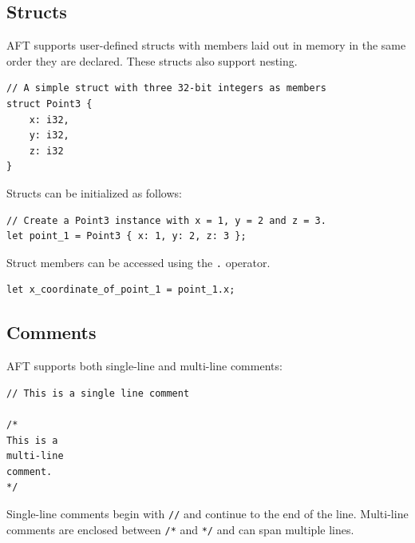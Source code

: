 \subsection{Structs}
AFT supports user-defined structs with members laid out in memory in the same order they are declared. These structs also support nesting.
\begin{verbatim}
// A simple struct with three 32-bit integers as members
struct Point3 {
    x: i32,
    y: i32,
    z: i32
}
\end{verbatim}
Structs can be initialized as follows:
\begin{verbatim}
// Create a Point3 instance with x = 1, y = 2 and z = 3.
let point_1 = Point3 { x: 1, y: 2, z: 3 };
\end{verbatim}
Struct members can be accessed using the \texttt{.} operator.
\begin{verbatim}
let x_coordinate_of_point_1 = point_1.x;
\end{verbatim}

\subsection{Comments}
AFT supports both single-line and multi-line comments:

\begin{verbatim}
// This is a single line comment

/* 
This is a
multi-line
comment.
*/
\end{verbatim}
Single-line comments begin with \texttt{//} and continue to the end of the line. Multi-line comments are enclosed between \texttt{/*} and \texttt{*/} and can span multiple lines.